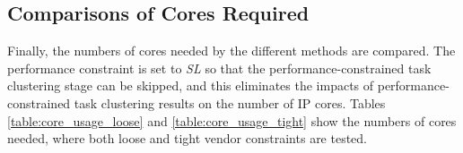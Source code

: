 \documentclass[10pt,journal, compsoc]{IEEEtran}
\begin{document}




\subsection{Comparisons of Cores Required}

Finally, the numbers of cores needed by the different methods are compared. The performance constraint is set to \textit{SL} so that the performance-constrained task clustering stage can be skipped, and this eliminates the impacts of performance-constrained task clustering results on the number of IP cores. Tables \ref{table:core_usage_loose} and \ref{table:core_usage_tight} show the numbers of cores needed, where both loose and tight vendor constraints are tested.%
\end{document}
